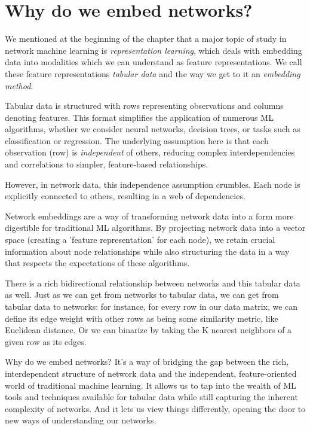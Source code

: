 \section{Why do we embed networks?}
\label{sec:ch6:why}

We mentioned at the beginning of the chapter that a major topic of study in network machine learning is \textit{representation learning}, which deals with embedding data into modalities which we can understand as feature representations. We call these feature representations \textit{tabular data} and the way we get to it an \textit{embedding method}.

Tabular data is structured with rows representing observations and columns denoting features. This format simplifies the application of numerous ML algorithms, whether we consider neural networks, decision trees, or tasks such as classification or regression. The underlying assumption here is that each observation (row) is \textit{independent} of others, reducing complex interdependencies and correlations to simpler, feature-based relationships.

However, in network data, this independence assumption crumbles. Each node is explicitly connected to others, resulting in a web of dependencies.

Network embeddings are a way of transforming network data into a form more digestible for traditional ML algorithms. By projecting network data into a vector space (creating a 'feature representation' for each node), we retain crucial information about node relationships while also structuring the data in a way that respects the expectations of these algorithms.

There is a rich bidirectional relationship between networks and this tabular data as well. Just as we can get from networks to tabular data, we can get from tabular data to networks: for instance, for every row in our data matrix, we can define its edge weight with other rows as being some similarity metric, like Euclidean distance. Or we can binarize by taking the K nearest neighbors of a given row as its edges.

Why do we embed networks? It's a way of bridging the gap between the rich, interdependent structure of network data and the independent, feature-oriented world of traditional machine learning. It allows us to tap into the wealth of ML tools and techniques available for tabular data while still capturing the inherent complexity of networks. And it lets us view things differently, opening the door to new ways of understanding our networks.



